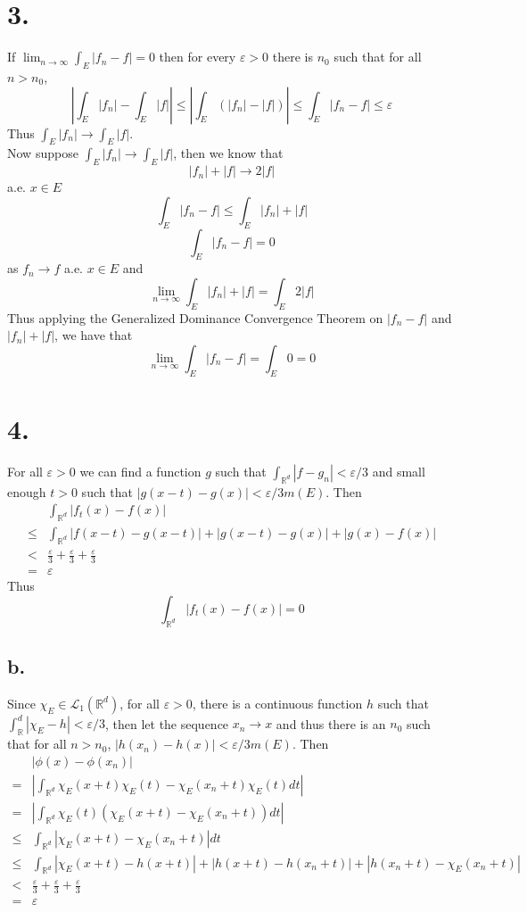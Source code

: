 \documentclass[11pt]{article}
\theoremstyle{mystyle}
\theoremstyle{definition}
\begin{document}
\section*{3.}
If $\lim_{n \to \infty} \int_E |f_n - f| = 0$ then for every $\varepsilon > 0$ there is $n_0$ such that for all $n > n_0$,  
\[
  \left|\int_E |f_n| - \int_E |f|\right| \le \left|\int_E (|f_n| - |f|) \right| \le  \int_E |f_n - f| \le \varepsilon
\]
Thus $\int_E |f_n| \to \int_E |f|$. \\
Now suppose $\int_E |f_n| \to \int_E |f|$, then we know that 
\[ 
  |f_n| + |f| \to 2|f|
\] 
a.e. $x \in E$  
\[
  \int_E |f_n - f| \le \int_E |f_n| + |f|
\] 
\[
  \int_E |f_n - f| = 0
\]
as $f_n \to f$ a.e. $x \in E$ and 
\[
  \lim_{n \to \infty} \int_E |f_n| + |f| = \int_E 2|f|
\]
Thus applying the Generalized Dominance Convergence Theorem on $|f_n - f|$ and $|f_n|+|f|$, we have that 
\[
  \lim_{n \to \infty} \int_E |f_n - f| = \int_E 0 = 0
\]
\newpage
\section*{4.}
For all $\varepsilon >0 $ we can find a function $g$ such that $\int_{\mathbb{R}^d} |f-g_n| < \varepsilon/3$ and small enough $t>0$ such that $|g(x-t) - g(x)| < \varepsilon / 3m(E)$. Then 
\begin{align*}
  & \int_{\mathbb{R}^d} |f_t(x) - f(x)| \\
  \le& \int_{\mathbb{R}^d} |f(x-t) - g(x-t)| + |g(x-t) - g(x)| + |g(x) - f(x)| \\
  <& \displaystyle\frac{\varepsilon}{3} + \displaystyle\frac{\varepsilon}{3} + \displaystyle\frac{\varepsilon}{3} \\
  =& \varepsilon
\end{align*}
Thus 
\[
  \int_{\mathbb{R}^d} |f_t(x) - f(x)| = 0
\]
\subsection*{b.}
Since $\chi_E \in \mathcal{L}_1(\mathbb{R}^d)$, for all $\varepsilon > 0$, there is a continuous function $h$ such that $\int_\mathbb{R}^d |\chi_E - h| < \varepsilon / 3$, then let the sequence $x_n \to x$ and thus there is an $n_0$ such that for all $n > n_0$, $|h(x_n) - h(x)| < \varepsilon/3m(E)$. Then
\begin{align*}
  & |\phi(x) - \phi(x_n)| \\
  =& \left| \int_{\mathbb{R}^d} \chi_E(x+t) \chi_E(t) - \chi_E(x_n+t) \chi_E(t) dt \right|\\
  =& \left|\int_{\mathbb{R}^d} \chi_E(t)\left( \chi_E(x+t) - \chi_E(x_n+t)  \right) dt \right| \\
  \le & \int_{\mathbb{R}^d} |\chi_E(x+t) - \chi_E(x_n+t) | dt \\
  \le & \int_{\mathbb{R}^d} |\chi_E(x+t) - h(x+t)| + |h(x+t) - h(x_n+t)| + |h(x_n+t) - \chi_E (x_n+t) | \\
  < & \displaystyle\frac{\varepsilon}{3} + \displaystyle\frac{\varepsilon}{3} + \displaystyle\frac{\varepsilon}{3} \\
  = & \varepsilon
\end{align*}
\end{document}

